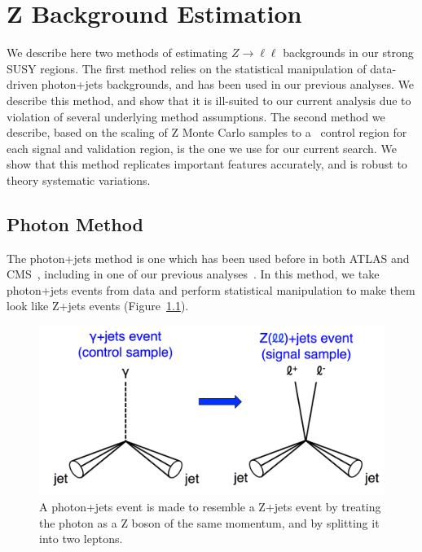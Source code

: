 \chapter{Z Background Estimation}

We describe here two methods of estimating $Z\rightarrow\ell\ell$ backgrounds in our strong SUSY regions. The first method relies on the statistical manipulation of data-driven photon+jets backgrounds, and has been used in our previous analyses. We describe this method, and show that it is ill-suited to our current analysis due to violation of several underlying method assumptions. The second method we describe, based on the scaling of Z Monte Carlo samples to a \mindphijm\ control region for each signal and validation region, is the one we use for our current search. We show that this method replicates important features accurately, and is robust to theory systematic variations.

\section{Photon Method}

The photon+jets method is one which has been used before in both ATLAS and CMS~\cite{blah}, including in one of our previous analyses~\cite{blah}. In this method, we take photon+jets events from data and perform statistical manipulation to make them look like Z+jets events (Figure~\ref{fig:photon_to_Z}).

\begin{figure}[htbp]
    \centering
    \includegraphics[width=\textwidth]{Images/SUSY/photon_to_Z.png}
    \caption{A photon+jets event is made to resemble a Z+jets event by treating the photon as a Z boson of the same momentum, and by splitting it into two leptons.}
    \label{fig:photon_to_Z}
\end{figure}

